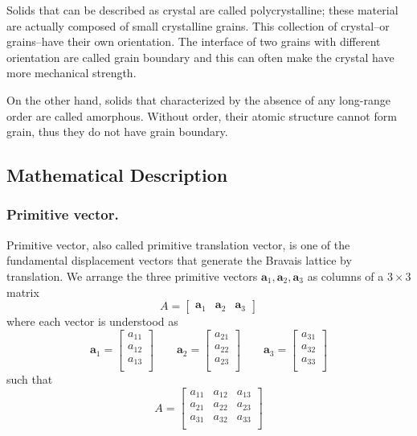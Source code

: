 \documentclass[../../../main.tex]{subfiles}
\begin{document}
Solids that can be described as crystal are called polycrystalline; these material are actually composed of small crystalline grains.
This collection of crystal--or grains--have their own orientation.
The interface of two grains with different orientation are called grain boundary and this can often make the crystal have more mechanical strength.

On the other hand, solids that  characterized by the absence of any long-range order are called amorphous.
Without order, their atomic structure cannot form grain, thus they do not have grain boundary.

\subsection{Mathematical Description}
\subsubsection{Primitive vector.}
Primitive vector, also called primitive translation vector, is one of the fundamental displacement vectors that generate the Bravais lattice by translation.
We arrange the three primitive vectors $\mathbf{a }_1,\mathbf{a }_2,\mathbf{a }_3$ as columns of a $3 \times 3$ matrix
\begin{equation*}
    A=\begin{bmatrix}
        \mathbf{a }_1 & \mathbf{a }_2 & \mathbf{a }_3
    \end{bmatrix}
\end{equation*}
where each vector is understood as
\begin{equation*}
    \mathbf{a}_1=
    \begin{bmatrix}
        a_{11} \\
        a_{12} \\
        a_{13} \\
    \end{bmatrix}\qquad
    \mathbf{a}_2=
    \begin{bmatrix}
        a_{21} \\
        a_{22} \\
        a_{23} \\
    \end{bmatrix}\qquad
    \mathbf{a}_3=
    \begin{bmatrix}
        a_{31} \\
        a_{32} \\
        a_{33} \\
    \end{bmatrix}
\end{equation*}
such that
\begin{equation*}
    A=\begin{bmatrix}
        a_{11} & a_{12} & a_{13} \\
        a_{21} & a_{22} & a_{23} \\
        a_{31} & a_{32} & a_{33} \\
    \end{bmatrix}
\end{equation*}
\end{document}
